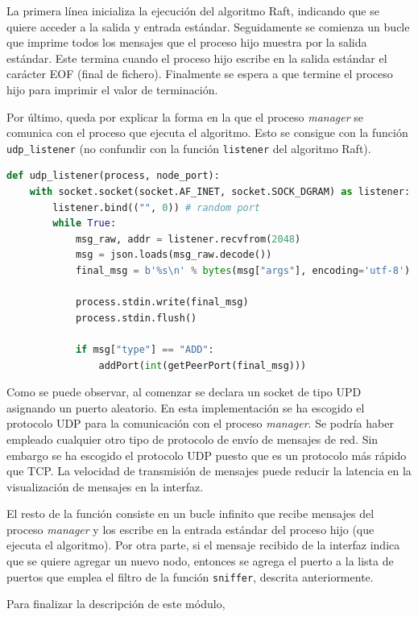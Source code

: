 La primera línea inicializa la ejecución del algoritmo Raft, indicando que se quiere acceder a la salida y entrada estándar. Seguidamente se comienza un bucle que imprime todos los mensajes que el proceso hijo muestra por la salida estándar. Este termina cuando el proceso hijo escribe en la salida estándar el carácter EOF (final de fichero). Finalmente se espera a que termine el proceso hijo para imprimir el valor de terminación.

Por último, queda por explicar la forma en la que el proceso \textit{manager} se comunica con el proceso que ejecuta el algoritmo. Esto se consigue con la función \texttt{udp\_listener} (no confundir con la función \texttt{listener} del algoritmo Raft).

\begin{lstlisting}[language=Python]
def udp_listener(process, node_port):
    with socket.socket(socket.AF_INET, socket.SOCK_DGRAM) as listener:
        listener.bind(("", 0)) # random port
        while True:
            msg_raw, addr = listener.recvfrom(2048)
            msg = json.loads(msg_raw.decode())
            final_msg = b'%s\n' % bytes(msg["args"], encoding='utf-8')
            
            process.stdin.write(final_msg)
            process.stdin.flush()
            
            if msg["type"] == "ADD":
                addPort(int(getPeerPort(final_msg)))
\end{lstlisting}

Como se puede observar, al comenzar se declara un socket de tipo UPD asignando un puerto aleatorio. En esta implementación se ha escogido el protocolo UDP para la comunicación con el proceso \textit{manager}. Se podría haber empleado cualquier otro tipo de protocolo de envío de mensajes de red. Sin embargo se ha escogido el protocolo UDP puesto que es un protocolo más rápido que TCP. La velocidad de transmisión de mensajes puede reducir la latencia en la visualización de mensajes en la interfaz.

El resto de la función consiste en un bucle infinito que recibe mensajes del proceso \textit{manager} y los escribe en la entrada estándar del proceso hijo (que ejecuta el algoritmo). Por otra parte, si el mensaje recibido de la interfaz indica que se quiere agregar un nuevo nodo, entonces se agrega el puerto a la lista de puertos que emplea el filtro de la función \texttt{sniffer}, descrita anteriormente.

Para finalizar la descripción de este módulo, 

